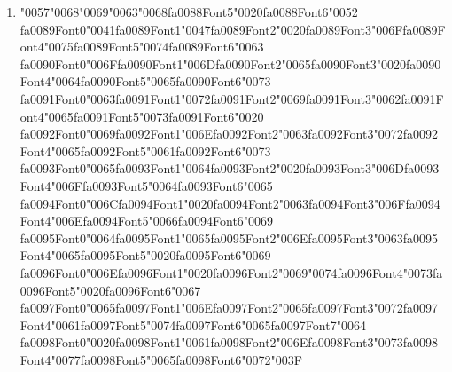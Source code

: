 \documentclass[12pt]{article}
\begin{document}
\begin{enumerate}[label=Q\arabic*.]
\item {\char"0057}{\char"0068}{\char"0069}{\char"0063}{\char"0068}{\csname fa0088Font5\endcsname\char"0020}{\csname fa0088Font6\endcsname\char"0052} {\csname fa0089Font0\endcsname\char"0041}{\csname fa0089Font1\endcsname\char"0047}{\csname fa0089Font2\endcsname\char"0020}{\csname fa0089Font3\endcsname\char"006F}{\csname fa0089Font4\endcsname\char"0075}{\csname fa0089Font5\endcsname\char"0074}{\csname fa0089Font6\endcsname\char"0063} {\csname fa0090Font0\endcsname\char"006F}{\csname fa0090Font1\endcsname\char"006D}{\csname fa0090Font2\endcsname\char"0065}{\csname fa0090Font3\endcsname\char"0020}{\csname fa0090Font4\endcsname\char"0064}{\csname fa0090Font5\endcsname\char"0065}{\csname fa0090Font6\endcsname\char"0073} {\csname fa0091Font0\endcsname\char"0063}{\csname fa0091Font1\endcsname\char"0072}{\csname fa0091Font2\endcsname\char"0069}{\csname fa0091Font3\endcsname\char"0062}{\csname fa0091Font4\endcsname\char"0065}{\csname fa0091Font5\endcsname\char"0073}{\csname fa0091Font6\endcsname\char"0020} {\csname fa0092Font0\endcsname\char"0069}{\csname fa0092Font1\endcsname\char"006E}{\csname fa0092Font2\endcsname\char"0063}{\csname fa0092Font3\endcsname\char"0072}{\csname fa0092Font4\endcsname\char"0065}{\csname fa0092Font5\endcsname\char"0061}{\csname fa0092Font6\endcsname\char"0073} {\csname fa0093Font0\endcsname\char"0065}{\csname fa0093Font1\endcsname\char"0064}{\csname fa0093Font2\endcsname\char"0020}{\csname fa0093Font3\endcsname\char"006D}{\csname fa0093Font4\endcsname\char"006F}{\csname fa0093Font5\endcsname\char"0064}{\csname fa0093Font6\endcsname\char"0065} {\csname fa0094Font0\endcsname\char"006C}{\csname fa0094Font1\endcsname\char"0020}{\csname fa0094Font2\endcsname\char"0063}{\csname fa0094Font3\endcsname\char"006F}{\csname fa0094Font4\endcsname\char"006E}{\csname fa0094Font5\endcsname\char"0066}{\csname fa0094Font6\endcsname\char"0069} {\csname fa0095Font0\endcsname\char"0064}{\csname fa0095Font1\endcsname\char"0065}{\csname fa0095Font2\endcsname\char"006E}{\csname fa0095Font3\endcsname\char"0063}{\csname fa0095Font4\endcsname\char"0065}{\csname fa0095Font5\endcsname\char"0020}{\csname fa0095Font6\endcsname\char"0069} {\csname fa0096Font0\endcsname\char"006E}{\csname fa0096Font1\endcsname\char"0020}{\csname fa0096Font2\endcsname\char"0069}{\char"0074}{\csname fa0096Font4\endcsname\char"0073}{\csname fa0096Font5\endcsname\char"0020}{\csname fa0096Font6\endcsname\char"0067} {\csname fa0097Font0\endcsname\char"0065}{\csname fa0097Font1\endcsname\char"006E}{\csname fa0097Font2\endcsname\char"0065}{\csname fa0097Font3\endcsname\char"0072}{\csname fa0097Font4\endcsname\char"0061}{\csname fa0097Font5\endcsname\char"0074}{\csname fa0097Font6\endcsname\char"0065}{\csname fa0097Font7\endcsname\char"0064} {\csname fa0098Font0\endcsname\char"0020}{\csname fa0098Font1\endcsname\char"0061}{\csname fa0098Font2\endcsname\char"006E}{\csname fa0098Font3\endcsname\char"0073}{\csname fa0098Font4\endcsname\char"0077}{\csname fa0098Font5\endcsname\char"0065}{\csname fa0098Font6\endcsname\char"0072}{\char"003F}

\end{enumerate}
\end{document}
